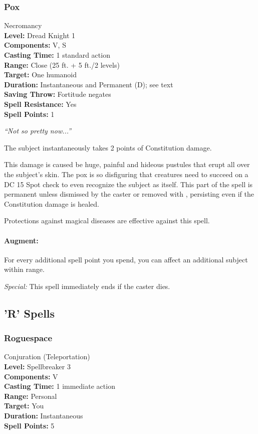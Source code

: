 \subsubsection{Pox}
\label{Spell:Pox}
Necromancy
\\ \textbf{Level:} Dread Knight 1
\\ \textbf{Components:} V, S
\\ \textbf{Casting Time:} 1 standard action
\\ \textbf{Range:} Close (25 ft. + 5 ft./2 levels)
\\ \textbf{Target:} One humanoid
\\ \textbf{Duration:} Instantaneous and Permanent (D); see text
\\ \textbf{Saving Throw:} Fortitude negates
\\ \textbf{Spell Resistance:} Yes
\\ \textbf{Spell Points:} 1

\emph{``Not so pretty now...''}

The subject instantaneously takes 2 points of Constitution damage.

This damage is caused be huge, painful and hideous pustules that erupt all over the subject's skin. The pox is so disfiguring that creatures need to succeed on a DC 15 Spot check to even recognize the subject as itself.
This part of the spell is permanent unless dismissed by the caster or removed with , persisting even if the Constitution damage is healed.

Protections against magical diseases are effective against this spell.

\paragraph{Augment:} For every additional spell point you spend, you can affect an additional subject within range.

\emph{Special:} This spell immediately ends if the caster dies. 

\subsection{'R' Spells}
\subsubsection{Roguespace}
\label{Spell:Roguespace}
Conjuration (Teleportation)
\\ \textbf{Level:} Spellbreaker 3
\\ \textbf{Components:} V
\\ \textbf{Casting Time:} 1 immediate action
\\ \textbf{Range:} Personal
\\ \textbf{Target:} You
\\ \textbf{Duration:} Instantaneous
\\ \textbf{Spell Points:} 5

